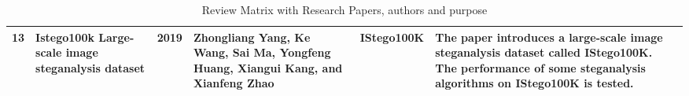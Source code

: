 \begin{table}[!h]
\begin{tabular}{|p{0.5cm}|p{3cm}|p{0.8cm}|p{2cm}|p{2cm}|p{4cm}|}
        13   & Istego100k   Large-scale image steganalysis dataset                             & 2019 & Zhongliang Yang, Ke Wang, Sai Ma, Yongfeng Huang, Xiangui Kang, and Xianfeng Zhao      & IStego100K       & The paper introduces a large-scale image steganalysis dataset called IStego100K. The performance of some steganalysis algorithms on IStego100K is tested.                                        \\ \hline                   
    \end{tabular} 
    \caption{Review Matrix with Research Papers, authors and purpose}
\end{table}


    

